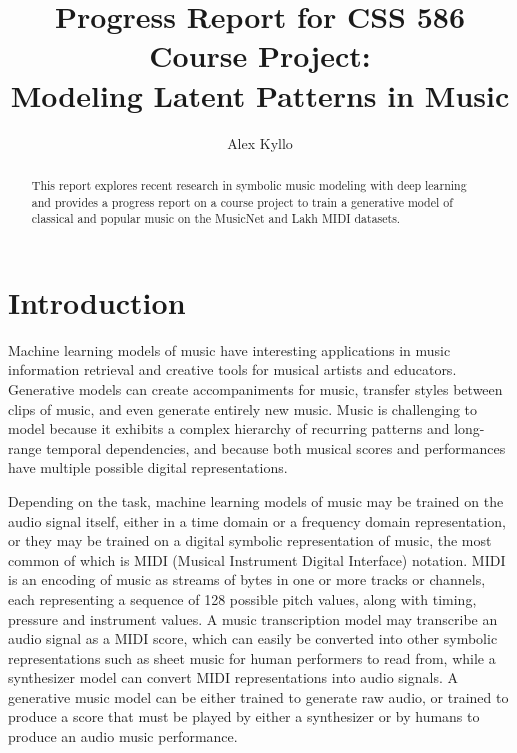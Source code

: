 \documentclass[sigconf,authorversion]{acmart}
\begin{document}
\renewcommand\footnotetextcopyrightpermission[1]{}
\pagestyle{plain}
\title{Progress Report for CSS 586 Course Project: \\
Modeling Latent Patterns in Music}


\author{Alex Kyllo}

\begin{abstract}
This report explores recent research in symbolic music modeling with
deep learning and provides a progress report on a course project to
train a generative model of classical and popular music on the
MusicNet and Lakh MIDI datasets.
\end{abstract}


\maketitle

\section{Introduction}

Machine learning models of music have interesting applications in
music information retrieval and creative tools for musical artists and
educators. Generative models can create accompaniments for music,
transfer styles between clips of music, and even generate entirely new
music. Music is challenging to model because it exhibits a complex
hierarchy of recurring patterns and long-range temporal dependencies,
and because both musical scores and performances have multiple
possible digital representations.

Depending on the task, machine learning models of music may be trained
on the audio signal itself, either in a time domain or a frequency
domain representation, or they may be trained on a digital symbolic
representation of music, the most common of which is MIDI (Musical
Instrument Digital Interface) notation. MIDI is an encoding of music
as streams of bytes in one or more tracks or channels, each
representing a sequence of 128 possible pitch values, along with
timing, pressure and instrument values. A music transcription model
may transcribe an audio signal as a MIDI score, which can easily be
converted into other symbolic representations such as sheet music for
human performers to read from, while a synthesizer model can convert
MIDI representations into audio signals. A generative music model can
be either trained to generate raw audio, or trained to produce a score
that must be played by either a synthesizer or by humans to produce an
audio music performance.
\end{document}
